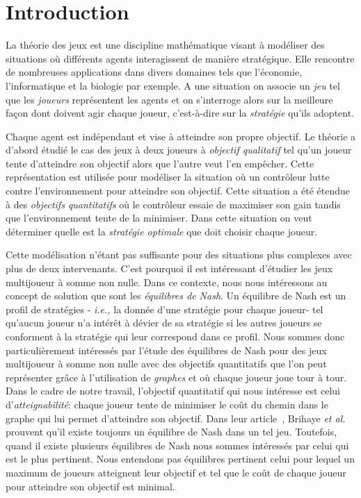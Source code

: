 
\section{Introduction}

La théorie des jeux est une discipline mathématique visant à modéliser des situations où différents agents interagissent de manière stratégique. Elle rencontre de nombreuses applications dans divers domaines tels que l'économie, l'informatique et la biologie par exemple.
A une situation on associe un \emph{jeu} tel que les \emph{joueurs} représentent les agents et on s'interroge alors sur la meilleure façon dont doivent agir chaque joueur, c'est-à-dire sur la \emph{stratégie} qu'ils adoptent.

Chaque agent est indépendant et vise à atteindre son propre objectif. Le théorie a d'abord étudié le cas des jeux à deux joueurs à \emph{objectif qualitatif} tel qu'un joueur tente d'atteindre son objectif alors que l'autre veut l'en empêcher. Cette représentation est utilisée pour modéliser la situation où un contrôleur lutte contre l'environnement pour atteindre son objectif. Cette situation a été étendue à des \emph{objectifs quantitatifs} où le contrôleur essaie de maximiser son gain tandis que l'environnement tente de la minimiser. Dans cette situation on veut déterminer quelle est la \emph{stratégie optimale} que doit choisir chaque joueur.

Cette modélisation n'étant pas suffisante pour des situations plus complexes avec plus de deux intervenants. C'est pourquoi il est intéressant d'étudier les jeux multijoueur à somme non nulle. Dans ce contexte, nous nous intéressons au concept de solution que sont les \emph{équilibres de Nash}. Un équilibre de Nash est un profil de stratégies - \emph{i.e.,} la donnée d'une stratégie pour chaque joueur- tel qu'aucun joueur n'a intérêt à dévier de sa stratégie si les autres joueurs se conforment à la stratégie qui leur correspond dans ce profil.
Nous sommes donc particulièrement intéressés par l'étude des équilibres de Nash pour des jeux multijoueur à somme non nulle avec des objectifs quantitatifs que l'on peut représenter grâce à l'utilisation de \emph{graphes} et où chaque joueur joue tour à tour.\\


Dans le cadre de notre travail, l'objectif quantitatif qui nous intéresse est celui d'\emph{atteignabilité}: chaque joueur tente de minimiser le coût du chemin dans le graphe qui lui permet d'atteindre son objectif. Dans leur article~\cite{DBLP:conf/lfcs/BrihayePS13}, Brihaye \emph{et al.} prouvent qu'il existe toujours un équilibre de Nash dans un tel jeu. Toutefois, quand il existe plusieurs équilibres de Nash nous sommes intéressés par celui qui est le plus pertinent. Nous entendons pas équilibres pertinent  celui pour lequel un maximum de joueurs atteignent leur objectif et tel que le coût de chaque joueur pour atteindre son objectif est minimal.

